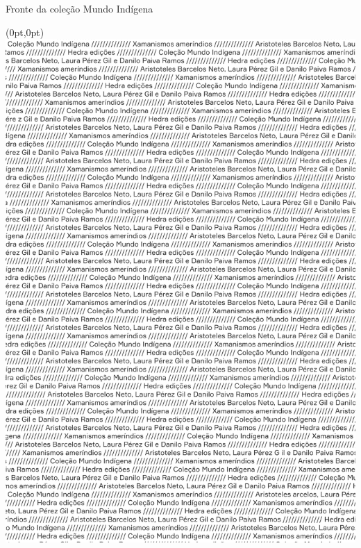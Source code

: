 Fronte da coleção Mundo Indígena
\thispagestyle{empty}
\begin{textblock*}{2.625in}(0pt,0pt)%
\vspace*{-3.72cm}
\hspace*{-2.9cm}\includegraphics[width=170mm]{./ABERTURA.png}  
\end{textblock*}
\clearpage
\pagebreak

